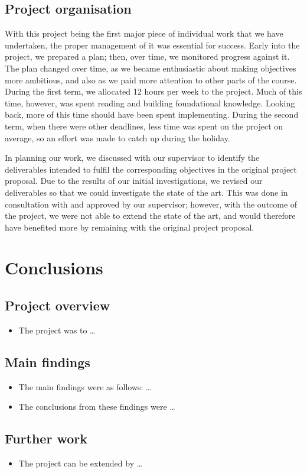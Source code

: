 \documentclass[12pt,a4paper]{article}
\begin{document}
\subsection{Project organisation}
With this project being the first major piece of individual work that we have undertaken, the proper management of it was essential for success. Early into the project, we prepared a plan; then, over time, we monitored progress against it. The plan changed over time, as we became enthusiastic about making objectives more ambitious, and also as we paid more attention to other parts of the course. During the first term, we allocated 12 hours per week to the project. Much of this time, however, was spent reading and building foundational knowledge. Looking back, more of this time should have been spent implementing. During the second term, when there were other deadlines, less time was spent on the project on average, so an effort was made to catch up during the holiday. 

In planning our work, we discussed with our supervisor to identify the deliverables intended to fulfil the corresponding objectives in the original project proposal. Due to the results of our initial investigations, we revised our deliverables so that we could investigate the state of the art. This was done in consultation with and approved by our supervisor; however, with the outcome of the project, we were not able to extend the state of the art, and would therefore have benefited more by remaining with the original project proposal. 

\section{Conclusions}
\subsection{Project overview}
\begin{itemize}
    \item The project was to \dots
\end{itemize}

\subsection{Main findings}
\begin{itemize}
    \item The main findings were as follows: \dots
    \item The conclusions from these findings were \dots
\end{itemize}

\subsection{Further work}
\begin{itemize}
    \item The project can be extended by \dots
\end{itemize}


\end{document}
